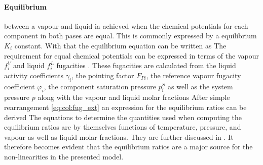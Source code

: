        \paragraph{Equilibrium} between a vapour and liquid ia achieved when the chemical potentials for each
        component in both pases are equal. This is commonly expressed by a equilibrium $K_i$ constant. With
        that the equilibrium equation can be written as
        The requirement for equal chemical potentials can be expressed in terms of the vapour $f_i^V$
        and liquid $f_i^L$ fugacities \cite{AndreasPfennig.2003}.
        These fugacities are calculated from the liquid activity coefficients $\gamma_i$,
        the pointing factor $F_{Pi}$, the reference vapour fugacity coefficient $\varphi_i$,
        the component saturation pressure $p^S_i$ as well as the system pressure $p$ along
        with the vapour and liquid molar fractions
        After simple rearrangement \eqref{eq:col:fug_ext} an expression for the equilibrium ratios
        can be derived
        The equations to determine the quantities used when computing the equilibrium ratios are by
        themselves functions of temperature, pressure, and vapour as well as liquid molar fractions.
        They are further discussed in . It therefore becomes evident that the
        equilibrium ratios are a major source for the non-linearities in the presented model.


